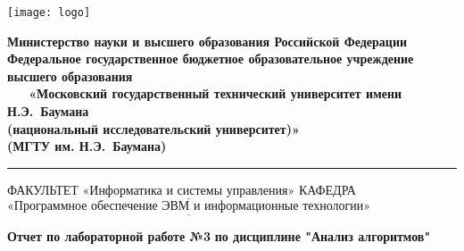   \thispagestyle{empty}
  \begin{titlepage}
      \noindent \begin{minipage}{0.15\textwidth}
      \texttt{[image: logo]}
      \end{minipage}
      \noindent\begin{minipage}{0.9\textwidth}\centering
          \textbf{Министерство науки и высшего образования Российской Федерации}\\
          \textbf{Федеральное государственное бюджетное образовательное учреждение высшего образования}\\
          \textbf{~~~«Московский государственный технический университет имени Н.Э.~Баумана}\\
          \textbf{(национальный исследовательский университет)»}\\
          \textbf{(МГТУ им. Н.Э.~Баумана)}
      \end{minipage}
      
      \noindent\rule{18cm}{3pt}
      \newline\newline
      \noindent ФАКУЛЬТЕТ $\underline{\text{«Информатика и системы управления»}}$ \newline\newline
      \noindent КАФЕДРА $\underline{\text{«Программное обеспечение ЭВМ и информационные технологии»}}$\newline\newline\newline\newline\newline\newline\newline\newline\newline\newline\newline
      
      
      \begin{center}
          \noindent\begin{minipage}{1.3\textwidth}\centering
              \Large\textbf{  Отчет по лабораторной работе №3}\newline
              \textbf{по дисциплине "Анализ алгоритмов"}\newline\newline
          \end{minipage}
      \end{center}
      

\end{titlepage}
